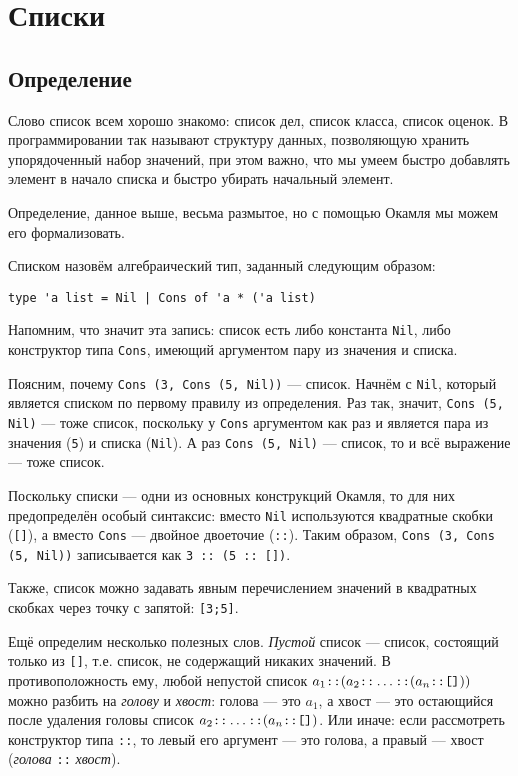 \section{Списки}

\subsection{Определение}

Слово список всем хорошо знакомо: список дел, список класса, список оценок.
В программировании так называют структуру данных, позволяющую хранить 
упорядоченный набор значений, при этом важно, что мы умеем быстро добавлять
элемент в начало списка и быстро убирать начальный элемент. 

Определение, данное выше, весьма размытое, но с помощью Окамля мы можем его 
формализовать.

Списком назовём алгебраический тип, заданный следующим образом:
\begin{verbatim}
type 'a list = Nil | Cons of 'a * ('a list)
\end{verbatim}
Напомним, что значит эта запись: список есть либо константа \verb!Nil!, 
либо конструктор типа \verb!Cons!, имеющий аргументом пару из значения и 
списка.

Поясним, почему \verb!Cons (3, Cons (5, Nil))! --- список. Начнём с
\verb!Nil!, который является списком по первому правилу из определения.
Раз так, значит, \verb!Cons (5, Nil)! --- тоже список,
поскольку у \verb!Cons! аргументом как раз и является пара из значения 
(\verb!5!) и списка (\verb!Nil!). А раз \verb!Cons (5, Nil)! --- список,
то и всё выражение --- тоже список.

Поскольку списки --- одни из основных конструкций Окамля, то для них
предопределён особый синтаксис: вместо \verb!Nil! используются 
квадратные скобки (\verb![]!),
а вместо \verb!Cons! --- двойное двоеточие (\verb!::!). Таким образом, 
\verb!Cons (3, Cons (5, Nil))! записывается как \verb!3 :: (5 :: [])!.

Также, список можно задавать явным перечислением значений в квадратных
скобках через точку с запятой: \verb![3;5]!.

Ещё определим несколько полезных слов. \emph{Пустой} список --- список, 
состоящий только из \verb![]!, т.е. список, не содержащий никаких значений.
В противоположность ему, любой непустой список 
$a_1 \verb!::! (a_2 \verb!::! \dots \verb!::! (a_n \verb!::! \verb![]!))$
можно разбить на \emph{голову} и \emph{хвост}: голова --- это $a_1$, а хвост --- это
остающийся после удаления головы список $a_2 \verb!::! \dots \verb!::! (a_n \verb!::! \verb![]!)$.
Или иначе: если рассмотреть конструктор типа \verb!::!, то левый его аргумент ---
это голова, а правый --- хвост (\emph{голова} \verb!::! \emph{хвост}).

